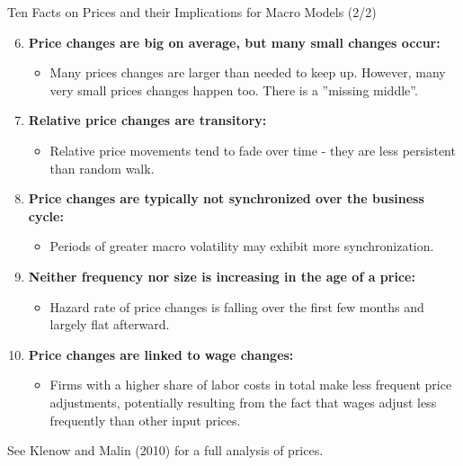 \documentclass[10pt,c,aspectratio=1610,handout]{beamer}
\begin{document}
\begin{frame}{Ten Facts on Prices and their Implications for Macro Models (2/2)}%
  \begin{enumerate}%
    \setcounter{enumi}{5}%
    \item \textbf{Price changes are big on average, but many small changes occur:}%
    \begin{itemize}%
      \item[$\rightarrow$] Many prices changes are larger than needed to keep up. However, many very small prices changes happen too. There is a ''missing middle''.%
    \end{itemize}%
    \vspace*{0.1in}%
    \pause%
    \item \textbf{Relative price changes are transitory:}%
    \begin{itemize}%
      \item[$\rightarrow$] Relative price movements tend to fade over time - they are less persistent than random walk.%
    \end{itemize}%
    \vspace*{0.1in}%
    \pause%
    \item \textbf{Price changes are typically not synchronized over the business cycle:}%
    \begin{itemize}%
      \item[$\rightarrow$] Periods of greater macro volatility may exhibit more synchronization.%
    \end{itemize}%
    \vspace*{0.1in}%
    \pause%
    \item \textbf{Neither frequency nor size is increasing in the age of a price:}%
    \begin{itemize}%
      \item[$\rightarrow$] Hazard rate of price changes is falling over the first few months and largely flat afterward.%
    \end{itemize}%
    \vspace*{0.1in}%
    \pause%
    \item \textbf{Price changes are linked to wage changes:}%
    \begin{itemize}%
      \item[$\rightarrow$] Firms with a higher share of labor costs in total make less frequent price adjustments, potentially resulting from the fact that wages adjust less frequently than other input prices.%
    \end{itemize}%
  \end{enumerate}%
  {\scriptsize See Klenow and Malin (2010) for a full analysis of prices.}%
\end{frame}%
\end{document}
